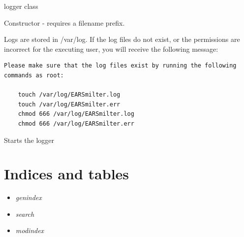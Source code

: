 \documentclass[letterpaper,10pt,english]{sphinxmanual}
\begin{document}
\begin{fulllineitems}
\label{codedocs/logs:logs.logger.logger}
logger class

\begin{fulllineitems}
\label{codedocs/logs:logs.logger.logger.__init__}
Constructor - requires a filename prefix.

Logs are stored in /var/log.  If the log files do not exist, or the permissions are incorrect for the
executing user, you will receive the following message:

\begin{Verbatim}[commandchars=\\\{\},formatcom=\footnotesize]
Please make sure that the log files exist by running the following commands as root:

    touch /var/log/EARSmilter.log
    touch /var/log/EARSmilter.err
    chmod 666 /var/log/EARSmilter.log
    chmod 666 /var/log/EARSmilter.err
\end{Verbatim}

\end{fulllineitems}


\begin{fulllineitems}
\label{codedocs/logs:logs.logger.logger.start}
Starts the logger

\end{fulllineitems}


\end{fulllineitems}



\chapter{Indices and tables}
\label{index:indices-and-tables}\begin{itemize}
\item {} 
\emph{genindex}

\item {} 
\emph{search}

\item {} 
\emph{modindex}

\end{itemize}



\renewcommand{\indexname}{Index}
\printindex
\end{document}
